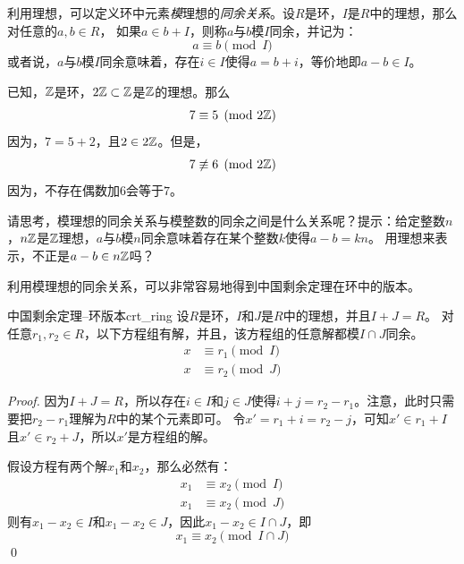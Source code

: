 利用理想，可以定义环中元素\emph{模}理想的\emph{同余关系}。设$R$是环，$I$是$R$中的理想，那么对任意的$a, b \in R$，
如果$a \in b + I$，则称$a$与$b$模$I$同余，并记为：
\[ a \equiv b \pmod{I}\]
或者说，$a$与$b$模$I$同余意味着，存在$i \in I$使得$a = b + i$，等价地即$a - b \in I$。%

\begin{example}
已知，${\mathbb Z}$是环，$2{\mathbb Z} \subset {\mathbb Z}$是${\mathbb Z}$的理想。那么
\[ 7 \equiv 5 \pmod{2{\mathbb Z}}\]
因为，$7 = 5 + 2$，且$2 \in 2{\mathbb Z}$。但是，
\[ 7 \not\equiv 6 \pmod{2{\mathbb Z}}\]
因为，不存在偶数加$6$会等于$7$。
\end{example}

\begin{thinking}
\label{rem:mod_ideal}
请思考，模理想的同余关系与模整数的同余之间是什么关系呢？提示：给定整数$n$，$n{\mathbb Z}$是${\mathbb Z}$理想，$a$与$b$模$n$同余意味着存在某个整数$k$使得$a - b = kn$。
用理想来表示，不正是$a - b \in n{\mathbb Z}$吗？
\end{thinking}

利用模理想的同余关系，可以非常容易地得到中国剩余定理在环中的版本。
\begin{theorem}{中国剩余定理--环版本}{crt_ring}
设$R$是环，$I$和$J$是$R$中的理想，并且$I + J = R$。 对任意$r_1, r_2 \in R$，以下方程组有解，并且，该方程组的任意解都模$I \cap J$同余。
\begin{align*}
x &\equiv r_1 \pmod{I}\\
x &\equiv r_2 \pmod{J}
\end{align*}

\end{theorem}

\begin{proof}
因为$I + J = R$，所以存在$i \in I$和$j \in J$使得$i + j = r_2 - r_1$。注意，此时只需要把$r_2 - r_1$理解为$R$中的某个元素即可。
令$x' = r_1 + i = r_2 - j$，可知$x' \in r_1 + I$且$x' \in r_2 + J$，所以$x'$是方程组的解。

假设方程有两个解$x_1$和$x_2$，那么必然有：
\begin{align*}
x_1 &\equiv x_2 \pmod{I}\\
x_1 &\equiv x_2 \pmod{J}
\end{align*}
则有$x_1 - x_2 \in I$和$x_1 - x_2 \in J$，因此$x_1 - x_2 \in I \cap J$，即
\[ x_1 \equiv x_2 \pmod{I \cap J}\]
\qed
\end{proof}

